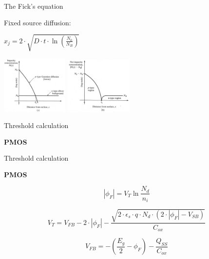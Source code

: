 \documentclass[aspectratio=169]{beamer}
\begin{document}
\begin{frame}{The Fick's equation}
	\begin{center}
		Fixed source diffusion:

		$ x_j = 2 \cdot\sqrt{D \cdot t \cdot \ln\left(\frac{N_0}{N_B}\right)} $

		\includegraphics[width=0.25\textwidth]{images/well_formation1.png}
		\includegraphics[width=0.25\textwidth]{images/well_formation2.png}
	\end{center}
\end{frame}

\begin{frame}{Threshold calculation}
	\begin{center}
		\textbf{PMOS}

		\begin{tikzpicture}[node distance = 3cm, auto, thick, scale=0.75, every node/.style={transform shape}]
			
		\end{tikzpicture}
	\end{center}
\end{frame}

\begin{frame}{Threshold calculation}
	\begin{center}
		\textbf{PMOS}

		\begin{equation}
			\left| \phi_F \right| = V_T \ln\frac{N_d}{n_i}
		\end{equation}

		\begin{equation}
			V_T
			=
			V_{FB}
			-
			2 \cdot \left| \phi_F \right|
			-
			\frac{
			\sqrt{2 \cdot \epsilon_s  \cdot q \cdot N_d \cdot \left( 2 \cdot \left| \phi_F \right| - V_{SB}\right) }
			}{C_{ox}}
		\end{equation}

		\begin{equation}
			V_{FB} = -\left( \frac{E_g}{2} - \phi_F \right) - \frac{Q_{SS}}{C_{ox}}
		\end{equation}

	\end{center}
\end{frame}
\end{document}
